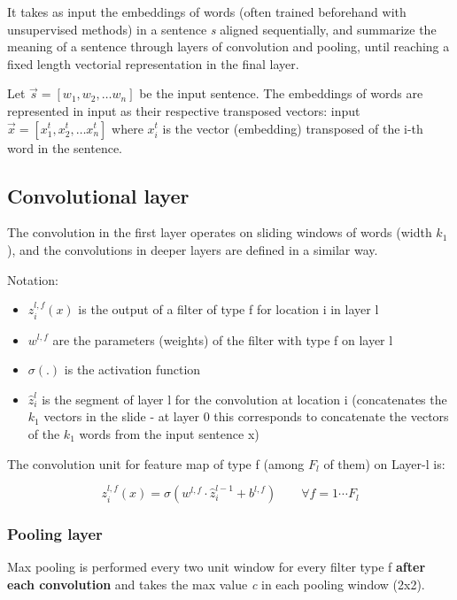 It takes as input the embeddings of words (often trained beforehand with unsupervised methods) in a sentence \textit{s} aligned sequentially, and summarize the
meaning of a sentence through layers of convolution and pooling, until reaching
a fixed length vectorial representation in the final layer.

Let $\vec{s} = [w_1, w_2, \dots w_n]$ be the input sentence. The embeddings of words are represented in input as their respective transposed vectors:
input $\vec{x} = [x_1^t, x_2^t, \dots x_n^t]$ where $x_i^t$ is the vector (embedding)
transposed of the i-th word in the sentence.

\subsection{Convolutional layer}

The convolution in the first layer operates on sliding windows of words
(width $k_1$), and the convolutions in deeper layers are defined in a
similar way.

Notation:

\begin{itemize}
\item $z_i^{l,f} (x)$ is the output of a filter of type f for location i in layer l
\item $w^{l,f}$ are the parameters (weights) of the filter with type f on layer l
\item $\sigma (.)$ is the activation function
\item $\hat{z}_i^l$ is the segment of layer l for the convolution at location i (concatenates the $k_1$ vectors in the slide - at layer 0 this corresponds to concatenate the vectors of the $k_1$ words from the input
sentence x)
\end{itemize}

The convolution unit for feature map of type f (among $F_l$ of them) on Layer-l is:

\begin{equation}
\tag{Convolution / output for a filter in ARC-I}
\label{eq:conv1}
z_i^{l,f} (x) = \sigma(w^{l,f} \cdot \hat{z}_i^{l-1} + b^{l,f}) \qquad
\forall f = 1 \cdots F_l
\end{equation}

\subsubsection{Pooling layer}

Max pooling is performed every two unit window for every filter type f \textbf{after each convolution} and takes the max value \textit{c} in each pooling window (2x2).


